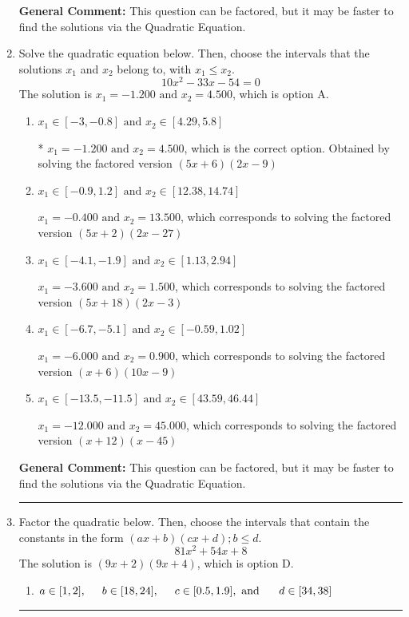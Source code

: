 \documentclass{extbook}[14pt]
\newcommand{\litem}[1]{\item #1

\rule{\textwidth}{0.4pt}}
\begin{document}
\begin{enumerate}
{\textbf{General Comment:} This question can be factored, but it may be faster to find the solutions via the Quadratic Equation.
}
\litem{
Solve the quadratic equation below. Then, choose the intervals that the solutions $x_1$ and $x_2$ belong to, with $x_1 \leq x_2$.
\[ 10x^{2} -33 x -54 = 0 \]The solution is \( x_1 = -1.200 \text{ and } x_2 = 4.500 \), which is option A.\begin{enumerate}[label=\Alph*.]
\item \( x_1 \in [-3, -0.8] \text{ and } x_2 \in [4.29, 5.8] \)

* $x_1 = -1.200 \text{ and } x_2 = 4.500$, which is the correct option. Obtained by solving the factored version $(5x + 6)(2x -9)$
\item \( x_1 \in [-0.9, 1.2] \text{ and } x_2 \in [12.38, 14.74] \)

$x_1 = -0.400 \text{ and } x_2 = 13.500$, which corresponds to solving the factored version $(5x + 2)(2x -27)$
\item \( x_1 \in [-4.1, -1.9] \text{ and } x_2 \in [1.13, 2.94] \)

$x_1 = -3.600 \text{ and } x_2 = 1.500$, which corresponds to solving the factored version $(5x + 18)(2x -3)$
\item \( x_1 \in [-6.7, -5.1] \text{ and } x_2 \in [-0.59, 1.02] \)

$x_1 = -6.000 \text{ and } x_2 = 0.900$, which corresponds to solving the factored version $(x + 6)(10x -9)$
\item \( x_1 \in [-13.5, -11.5] \text{ and } x_2 \in [43.59, 46.44] \)

$x_1 = -12.000 \text{ and } x_2 = 45.000$, which corresponds to solving the factored version $(x + 12)(x -45)$
\end{enumerate}

\textbf{General Comment:} This question can be factored, but it may be faster to find the solutions via the Quadratic Equation.
}
\litem{
Factor the quadratic below. Then, choose the intervals that contain the constants in the form $(ax+b)(cx+d); b \leq d.$
\[ 81x^{2} +54 x + 8 \]The solution is \( (9x + 2)(9x + 4) \), which is option D.\begin{enumerate}[label=\Alph*.]
\item \( a \in [1, 2], \hspace*{5mm} b \in [18, 24], \hspace*{5mm} c \in [0.5, 1.9], \text{ and } \hspace*{5mm} d \in [34, 38] \)


\end{enumerate}}
\end{enumerate}
\end{document}
